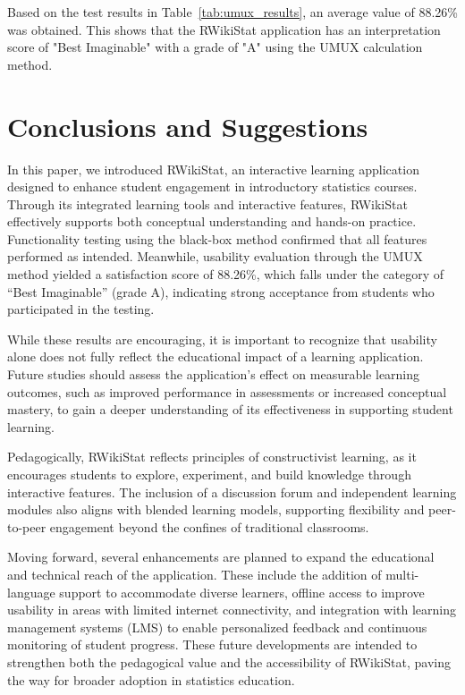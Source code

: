 \documentclass[conference,a4paper]{IEEEtran}
\begin{document}
Based on the test results in Table~\ref{tab:umux_results}, an average value of 88.26\% was obtained. This shows that the RWikiStat application has an interpretation score of "Best Imaginable" with a grade of "A" using the UMUX calculation method.



\section{Conclusions and Suggestions}
\label{sect:conclusion}

In this paper, we introduced RWikiStat, an interactive learning application designed to enhance student engagement in introductory statistics courses. Through its integrated learning tools and interactive features, RWikiStat effectively supports both conceptual understanding and hands-on practice.
Functionality testing using the black-box method confirmed that all features performed as intended. Meanwhile, usability evaluation through the UMUX method yielded a satisfaction score of 88.26\%, which falls under the category of “Best Imaginable” (grade A), indicating strong acceptance from students who participated in the testing. 

While these results are encouraging, it is important to recognize that usability alone does not fully reflect the educational impact of a learning application. Future studies should assess the application’s effect on measurable learning outcomes, such as improved performance in assessments or increased conceptual mastery, to gain a deeper understanding of its effectiveness in supporting student learning. 

Pedagogically, RWikiStat reflects principles of constructivist learning, as it encourages students to explore, experiment, and build knowledge through interactive features. The inclusion of a discussion forum and independent learning modules also aligns with blended learning models, supporting flexibility and peer-to-peer engagement beyond the confines of traditional classrooms. 

Moving forward, several enhancements are planned to expand the educational and technical reach of the application. These include the addition of multi-language support to accommodate diverse learners, offline access to improve usability in areas with limited internet connectivity, and integration with learning management systems (LMS) to enable personalized feedback and continuous monitoring of student progress. These future developments are intended to strengthen both the pedagogical value and the accessibility of RWikiStat, paving the way for broader adoption in statistics education.
\end{document}
